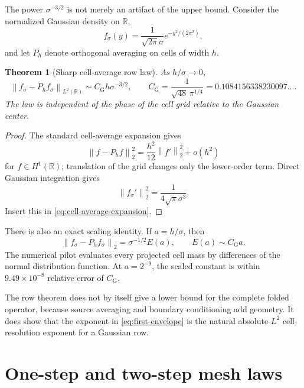 \documentclass[11pt]{article}
\newtheorem{theorem}{Theorem}[section]
\theoremstyle{definition}
\theoremstyle{remark}
\newcommand{\R}{\mathbb R}
\newcommand{\norm}[1]{\left\lVert #1\right\rVert}
\begin{document}
The power $\sigma^{-3/2}$ is not merely an artifact of the upper bound.
Consider the normalized Gaussian density on $\R$,
\begin{equation}
 f_\sigma(y)=\frac1{\sqrt{2\pi}\sigma}
 e^{-y^2/(2\sigma^2)},
 \label{eq:gaussian-row}
\end{equation}
and let $P_h$ denote orthogonal averaging on cells of width $h$.

\begin{theorem}[Sharp cell-average row law]
\label{thm:sharp-row}
As $h/\sigma\to0$,
\begin{equation}
 \norm{f_\sigma-P_hf_\sigma}_{L^2(\R)}
 \sim C_{\mathrm G}h\sigma^{-3/2},
 \qquad
 C_{\mathrm G}
 =\frac1{\sqrt{48}\,\pi^{1/4}}
 =0.1084156338230097\ldots.
 \label{eq:sharp-row-law}
\end{equation}
The law is independent of the phase of the cell grid relative to the
Gaussian center.
\end{theorem}

\begin{proof}
The standard cell-average expansion gives
\begin{equation}
 \norm{f-P_hf}_2^2
 =\frac{h^2}{12}\norm{f'}_2^2+o(h^2)
 \label{eq:cell-average-expansion}
\end{equation}
for $f\in H^1(\R)$; translation of the grid changes only the lower-order
term.  Direct Gaussian integration gives
\[
 \norm{f_\sigma'}_2^2
 =\frac1{4\sqrt\pi\sigma^3}.
\]
Insert this in \eqref{eq:cell-average-expansion}.
\end{proof}

There is also an exact scaling identity.  If $a=h/\sigma$, then
\begin{equation}
 \norm{f_\sigma-P_hf_\sigma}_2
 =\sigma^{-1/2}E(a),
 \qquad
 E(a)\sim C_{\mathrm G}a.
 \label{eq:row-scaling}
\end{equation}
The numerical pilot evaluates every projected cell mass by differences of
the normal distribution function.  At $a=2^{-9}$, the scaled constant is
within $9.49\times10^{-8}$ relative error of $C_{\mathrm G}$.

The row theorem does not by itself give a lower bound for the complete
folded operator, because source averaging and boundary conditioning add
geometry.  It does show that the exponent in \eqref{eq:first-envelope} is
the natural absolute-$L^2$ cell-resolution exponent for a Gaussian row.

\section{One-step and two-step mesh laws}
\label{sec:mesh-laws}
\end{document}
